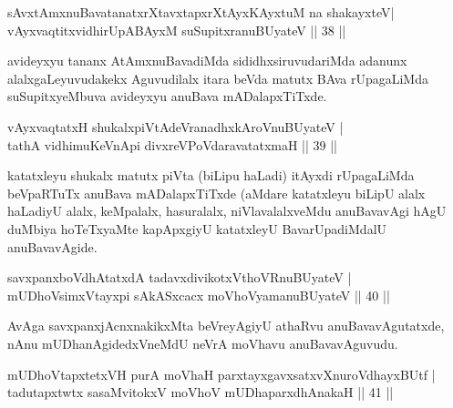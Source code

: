 \begin{shl}
sAvxtAmxnuBavatanatxrXtavxtapxrXtAyxKAyxtuM na shakayxteV\footnotemark[1] |\\
vAyxvaqtitxvidhirUpABAyxM \footnotemark[2]suSupitxranuBUyateV \hfill || 38 ||
\end{shl}

\begin{artha}
avideyxyu tananx AtAmxnuBavadiMda sididhxsiruvudariMda adanunx alalxgaLe\-yuvudakekx Aguvudilalx itara beVda matutx BAva rUpagaLiMda suSupitxyeMbuva avideyxyu anuBava mADalapxTiTxde.
\end{artha}


\begin{shl}
vAyxvaqtatxH shukalxpiVtAdeVranadhxkAroV\s nuBUyateV |\\
tathA vidhimuKeVnApi divxreVPoVdaravatatxmaH \hfill || 39 ||
\end{shl}

\begin{artha}
katatxleyu shukalx matutx piVta (biLipu haLadi) itAyxdi rUpagaLiMda beVpaRTuTx anuBava mADalapxTiTxde (aMdare katatxleyu biLipU alalx haLadiyU alalx, keMpalalx, hasuralalx, niVlavalalxveMdu anuBavavAgi hAgU duMbiya hoTeTxyaMte kapApxgiyU katatxleyU BavarUpadiMdalU anuBavavAgide.
\end{artha}

\begin{shl}
savxpanxboVdhAtatxdA tadavxdivikotxV\s thoVR\s nuBUyateV |\\
mUDhoV\s simxVtayxpi sAkASxcacx moVhoV\s yamanuBUyateV \hfill || 40 ||
\end{shl}

\begin{artha}
AvAga savxpanxjAcnxnakikxMta beVreyAgiyU athaRvu anuBavavAgutatxde, nAnu mUDhanAgidedxVneMdU neVrA moVhavu anuBavavAguvudu.
\end{artha}%


\begin{shl}
mUDhoVtapxtetxVH purA moVhaH parxtayxgavxsatxvXnuroVdhayxBUtf |\\
tadutapxtwtx sasaMvitokxV moVhoV mUDhaparxdhAnakaH \hfill || 41 ||
\end{shl}

